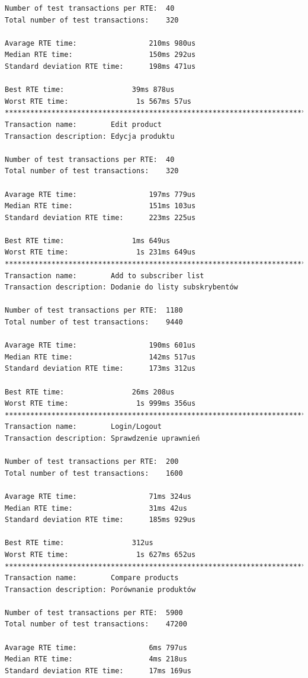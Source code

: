 \begin{Verbatim}
Number of test transactions per RTE:  40
Total number of test transactions:    320

Avarage RTE time:                 210ms 980us
Median RTE time:                  150ms 292us
Standard deviation RTE time:      198ms 471us

Best RTE time:                39ms 878us
Worst RTE time:                1s 567ms 57us
*********************************************************************************
Transaction name:        Edit product
Transaction description: Edycja produktu

Number of test transactions per RTE:  40
Total number of test transactions:    320

Avarage RTE time:                 197ms 779us
Median RTE time:                  151ms 103us
Standard deviation RTE time:      223ms 225us

Best RTE time:                1ms 649us
Worst RTE time:                1s 231ms 649us
*********************************************************************************
Transaction name:        Add to subscriber list
Transaction description: Dodanie do listy subskrybentów

Number of test transactions per RTE:  1180
Total number of test transactions:    9440

Avarage RTE time:                 190ms 601us
Median RTE time:                  142ms 517us
Standard deviation RTE time:      173ms 312us

Best RTE time:                26ms 208us
Worst RTE time:                1s 999ms 356us
*********************************************************************************
Transaction name:        Login/Logout
Transaction description: Sprawdzenie uprawnień

Number of test transactions per RTE:  200
Total number of test transactions:    1600

Avarage RTE time:                 71ms 324us
Median RTE time:                  31ms 42us
Standard deviation RTE time:      185ms 929us

Best RTE time:                312us
Worst RTE time:                1s 627ms 652us
*********************************************************************************
Transaction name:        Compare products
Transaction description: Porównanie produktów

Number of test transactions per RTE:  5900
Total number of test transactions:    47200

Avarage RTE time:                 6ms 797us
Median RTE time:                  4ms 218us
Standard deviation RTE time:      17ms 169us


\end{Verbatim}
